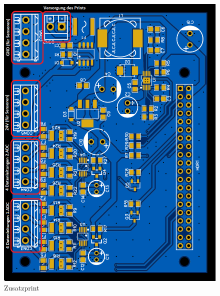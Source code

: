\newpage
\begin{figure}[h]
    \centering
    \includegraphics[width=1\linewidth]{Images/PCB1.PNG}
    \caption{Zusatzprint}
    \label{fig:Zusatzprint}
\end{figure}